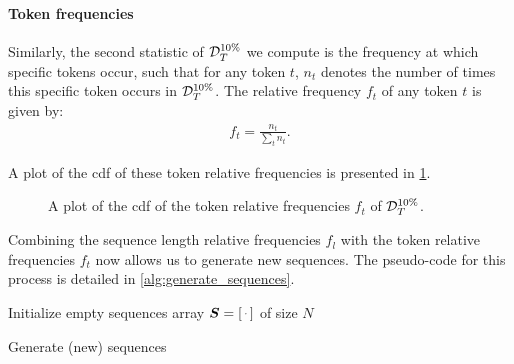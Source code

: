 \paragraph{Token frequencies}
Similarly, the second statistic of $\mathcal{D}_T^{10\%}$ we compute is the frequency at which specific tokens occur, such that for any token $t$, $n_t$ denotes the number of times this specific token occurs in $\mathcal{D}_T^{10\%}$. The relative frequency $f_t$ of any token $t$ is given by:
\begin{align*}
    f_t = \frac{n_t}{\sum_t n_t}.
\end{align*}

A plot of the \gls{cdf} of these token relative frequencies is presented in \cref{fig:token_cdf_plot}.

\begin{figure}[ht!]
    \begin{center}
        
    \end{center}
    \caption[Plot of CDF of token relative frequencies]{A plot of the \gls{cdf} of the token relative frequencies $f_t$ of $\mathcal{D}_T^{10\%}$.}
    \label{fig:token_cdf_plot}
\end{figure}


Combining the sequence length relative frequencies $f_l$ with the token relative frequencies $f_t$ now allows us to generate new sequences. The pseudo-code for this process is detailed in \cref{alg:generate_sequences}.

\begin{algorithm}[H]
    \SetArgSty{}
    
    
    Initialize empty sequences array $\vect{S} = \begin{bsmallmatrix} \cdot \end{bsmallmatrix}$ of size $N$\;
    
    \caption{Generate (new) sequences}
    \label{alg:generate_sequences}
\end{algorithm}

